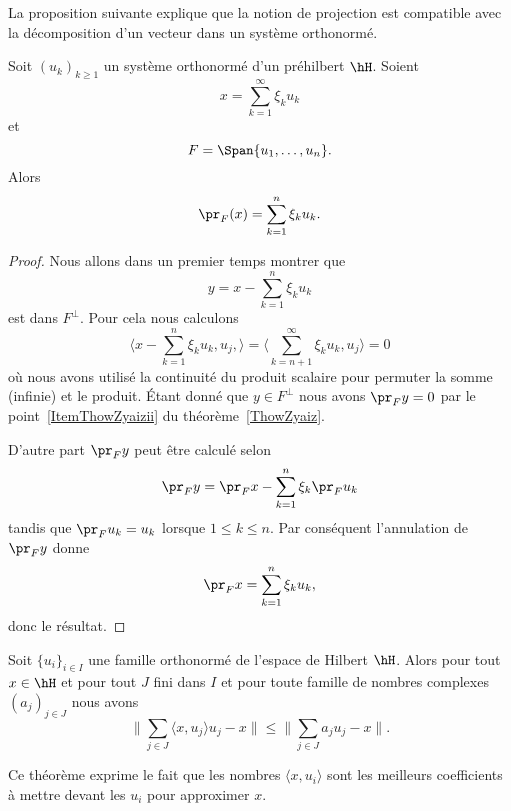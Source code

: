 La proposition suivante explique que la notion de projection est compatible avec la décomposition d'un vecteur dans un système orthonormé.
\begin{proposition}
    Soit \( (u_k)_{k\geq 1}\) un système orthonormé d'un préhilbert \( \hH\). Soient
    \begin{equation}
        x=\sum_{k=1}^{\infty}\xi_ku_k
    \end{equation}
    et
    \begin{equation}
        F=\Span\{ u_1,\ldots, u_n \}.
    \end{equation}
    Alors
    \begin{equation}
        \pr_F(x)=\sum_{k=1}^n\xi_ku_k.
    \end{equation}
\end{proposition}

\begin{proof}
    Nous allons dans un premier temps montrer que
    \begin{equation}
        y=x-\sum_{k=1}^n\xi_ku_k
    \end{equation}
    est dans \( F^{\perp}\). Pour cela nous calculons
    \begin{equation}
        \langle x-\sum_{k=1}^n\xi_ku_k,u_j, \rangle =\langle \sum_{k=n+1}^{\infty}\xi_ku_k, u_j\rangle =0
    \end{equation}
    où nous avons utilisé la continuité du produit scalaire pour permuter la somme (infinie) et le produit. Étant donné que \( y\in F^{\perp}\) nous avons \( \pr_Fy=0\) par le point~\ref{ItemThowZyaizii} du théorème~\ref{ThowZyaiz}.

    D'autre part \( \pr_Fy\) peut être calculé selon
    \begin{equation}
        \pr_Fy=\pr_Fx-\sum_{k=1}^n\xi_k\pr_Fu_k
    \end{equation}
    tandis que \( \pr_Fu_k=u_k\) lorsque \( 1\leq k\leq n\). Par conséquent l'annulation de \( \pr_Fy\) donne
    \begin{equation}
        \pr_Fx=\sum_{k=1}^n\xi_ku_k,
    \end{equation}
    donc le résultat.
\end{proof}

\begin{theorem} \label{ThooRArDp}
    Soit \( \{ u_i \}_{i\in I}\) une famille orthonormé de l'espace de Hilbert \( \hH\). Alors pour tout \( x\in \hH\) et pour tout \( J\) fini dans \( I\) et pour toute famille de nombres complexes  \( (a_j)_{j\in J}\) nous avons
    \begin{equation}
        \| \sum_{j\in J}\langle x, u_j\rangle u_j-x \|\leq \| \sum_{j\in J}a_ju_j-x \|.
    \end{equation}
\end{theorem}
Ce théorème exprime le fait que les nombres \( \langle x, u_i\rangle \) sont les meilleurs coefficients à mettre devant les \( u_i\) pour approximer \( x\).

